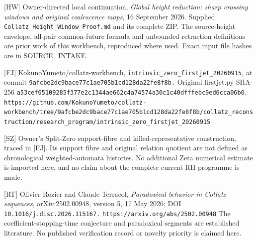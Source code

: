 {[}HW{]} Owner-directed local continuation, \emph{Global height
reduction: sharp crossing windows and original coalescence maps}, 16
September 2026. Supplied \nolinkurl{Collatz_Height_Window_Proof.md} and
its complete ZIP. The source-height envelope, all-pair common-future
formula and unbounded retraction definitions are prior work of this
workbench, reproduced where used. Exact input file hashes are in
SOURCE\_INTAKE.

{[}FJ{]} KokunoYumeto/collatz-workbench,
\nolinkurl{intrinsic_zero_firstjet_20260915}, at commit
\nolinkurl{9afcbe2dc9bace77c1ae705b1cd128da22fe8f8b.} Original
firstjet.py SHA-256
\nolinkurl{a53cef65109285f377e2c1344ae662c4a74574a30c1c40dfffebc9ed6cca06b0}.
\nolinkurl{https://github.com/KokunoYumeto/collatz-workbench/tree/9afcbe2dc9bace77c1ae705b1cd128da22fe8f8b/collatz_reconstruction/research_program/intrinsic_zero_firstjet_20260915}

{[}SZ{]} Owner's Split-Zero support-fibre and killed-representative
construction, traced in {[}FJ{]}. Its support fibre and original
relation quotient are not defined as chronological weighted-automata
histories. No additional Zeta numerical estimate is imported here, and
no claim about the complete current RH programme is made.

{[}RT{]} Olivier Rozier and Claude Terracol, \emph{Paradoxical behavior
in Collatz sequences}, arXiv:2502.00948, version 5, 17 May 2026; DOI
\nolinkurl{10.1016/j.disc.2026.115167.}
\nolinkurl{https://arxiv.org/abs/2502.00948} The
coefficient-stopping-time conjecture and paradoxical segments are
established literature. No published verification record or novelty
priority is claimed here.
